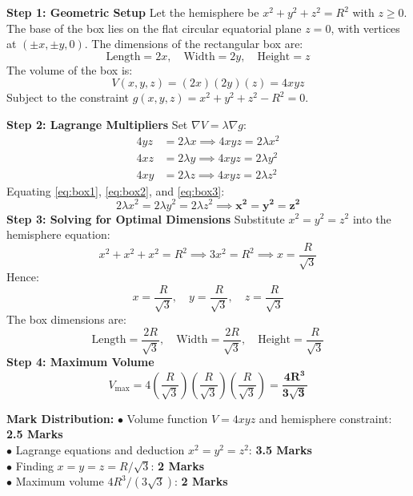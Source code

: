\begin{solutionbox}
\textbf{Step 1: Geometric Setup}
Let the hemisphere be $x^2 + y^2 + z^2 = R^2$ with $z \ge 0$.
The base of the box lies on the flat circular equatorial plane $z = 0$, with vertices at $(\pm x, \pm y, 0)$.
The dimensions of the rectangular box are:
\[
\text{Length} = 2x, \quad \text{Width} = 2y, \quad \text{Height} = z
\]
The volume of the box is:
\[
V(x,y,z) = (2x)(2y)(z) = 4xyz
\]
Subject to the constraint $g(x,y,z) = x^2 + y^2 + z^2 - R^2 = 0$.

\textbf{Step 2: Lagrange Multipliers}
Set $\nabla V = \lambda \nabla g$:
\begin{align}
4yz &= 2\lambda x \implies 4xyz = 2\lambda x^2 \label{eq:box1} \\
4xz &= 2\lambda y \implies 4xyz = 2\lambda y^2 \label{eq:box2} \\
4xy &= 2\lambda z \implies 4xyz = 2\lambda z^2 \label{eq:box3}
\end{align}
Equating \eqref{eq:box1}, \eqref{eq:box2}, and \eqref{eq:box3}:
\[
2\lambda x^2 = 2\lambda y^2 = 2\lambda z^2 \implies \mathbf{x^2 = y^2 = z^2}
\]
\textbf{Step 3: Solving for Optimal Dimensions}
Substitute $x^2 = y^2 = z^2$ into the hemisphere equation:
\[
x^2 + x^2 + x^2 = R^2 \implies 3x^2 = R^2 \implies x = \frac{R}{\sqrt{3}}
\]
Hence:
\[
x = \frac{R}{\sqrt{3}}, \quad y = \frac{R}{\sqrt{3}}, \quad z = \frac{R}{\sqrt{3}}
\]
The box dimensions are:
\[
\text{Length} = \frac{2R}{\sqrt{3}}, \quad \text{Width} = \frac{2R}{\sqrt{3}}, \quad \text{Height} = \frac{R}{\sqrt{3}}
\]
\textbf{Step 4: Maximum Volume}
\[
V_{\max} = 4\left(\frac{R}{\sqrt{3}}\right)\left(\frac{R}{\sqrt{3}}\right)\left(\frac{R}{\sqrt{3}}\right) = \mathbf{\frac{4R^3}{3\sqrt{3}}}
\]

\begin{markingrubric}
\textbf{Mark Distribution:}
$\bullet$ Volume function $V = 4xyz$ and hemisphere constraint: \textbf{2.5 Marks}\\
$\bullet$ Lagrange equations and deduction $x^2 = y^2 = z^2$: \textbf{3.5 Marks}\\
$\bullet$ Finding $x = y = z = R/\sqrt{3}$: \textbf{2 Marks}\\
$\bullet$ Maximum volume $4R^3 / (3\sqrt{3})$: \textbf{2 Marks}
\end{markingrubric}
\end{solutionbox}

